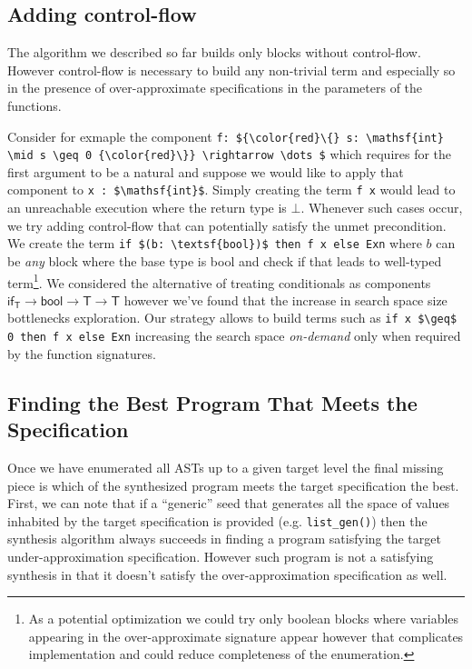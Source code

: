 \documentclass[review, sigplan]{acmart}
\begin{document}
\subsection{Adding control-flow}

The algorithm we described so far builds only blocks without
control-flow.
However control-flow is necessary to build any non-trivial term and
especially so in the presence of over-approximate specifications
in the parameters of the functions.

Consider for exmaple the component
\lstinline[basicstyle=\small\ttfamily, mathescape]|f: ${\color{red}\{} s: \mathsf{int} \mid s \geq 0 {\color{red}\}} \rightarrow \dots $|
which requires for the first argument to be a natural and suppose
we would like to apply that component to \lstinline[basicstyle=\small\ttfamily, mathescape]|x : $\mathsf{int}$|.
Simply creating the term \lstinline[language=caml, basicstyle=\small\ttfamily, mathescape]|f x|
would lead to an unreachable execution where the return type is $\bot$.
Whenever such cases occur, we try adding control-flow that can potentially
satisfy the unmet precondition.
We create the term \lstinline[language=caml, basicstyle=\small\ttfamily, mathescape]|if $(b: \textsf{bool})$ then f x else Exn|
where $b$ can be \emph{any} block where the base type is \textsf{bool}
and check if that leads to well-typed term\footnote{
  As a potential optimization we could try only boolean blocks where
  variables appearing in the over-approximate signature appear however
  that complicates implementation and could reduce completeness of the
  enumeration.}.
We considered the alternative of treating conditionals as components
$\textsf{if}_\textsf{T} \rightarrow \textsf{bool} \rightarrow \textsf{T} \rightarrow \textsf{T}$
however we've found that the increase in search space size
bottlenecks exploration.
Our strategy allows to build terms such as
\lstinline[language=caml, basicstyle=\small\ttfamily, mathescape]|if x $\geq$ 0 then f x else Exn|
increasing the search space \emph{on-demand} only when required
by the function signatures.

\subsection{Finding the Best Program That Meets the Specification}
Once we have enumerated all ASTs up to a given target level the
final missing piece is which of the synthesized program
meets the target specification the best.
First, we can note that if a ``generic'' seed that generates
all the space of values inhabited by the target specification is provided
(e.g. \lstinline[language=caml, basicstyle=\small\ttfamily, mathescape]|list_gen()|)
then the synthesis algorithm always succeeds in finding a program satisfying the
target under-approximation specification.
However such program is not a satisfying synthesis in that it doesn't satisfy
the over-approximation specification as well.
\end{document}
